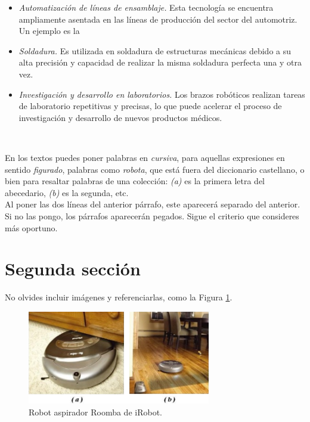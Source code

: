 \begin{itemize}
  \item \textit{Automatización de líneas de ensamblaje.} Esta tecnología se encuentra ampliamente asentada en las líneas de  producción 
                                                        del sector del automotriz. Un ejemplo es la 
  \item \textit{Soldadura.} Es utilizada en soldadura de estructuras mecánicas debido a su alta precisión y capacidad de realizar 
                            la misma soldadura perfecta una y otra vez.
  \item \textit{Investigación y desarrollo en laboratorios.} Los brazos robóticos realizan tareas de laboratorio repetitivas y precisas, 
                              lo que puede acelerar el proceso de investigación y desarrollo de nuevos productos médicos.
 \end{itemize}\

En los textos puedes poner palabras en \textit{cursiva}, para aquellas expresiones en sentido \textit{figurado}, palabras como \textit{robota}, que está fuera del diccionario castellano, o bien para resaltar palabras de una colección: \textit{(a)} es la primera letra del abecedario, \textit{(b)} es la segunda, etc.\\

Al poner las dos líneas del anterior párrafo, este aparecerá separado del anterior. Si no las pongo, los párrafos aparecerán pegados. Sigue el criterio que consideres más oportuno.

\section{Segunda sección}
\label{sec:segundaseccion}

No olvides incluir imágenes y referenciarlas, como la Figura \ref{fig:roomba}.

\begin{figure} [h!]
  \begin{center}
    \includegraphics[width=8cm]{figs/roomba}
  \end{center}
  \caption{Robot aspirador Roomba de iRobot.}
  \label{fig:roomba}
\end{figure}\

